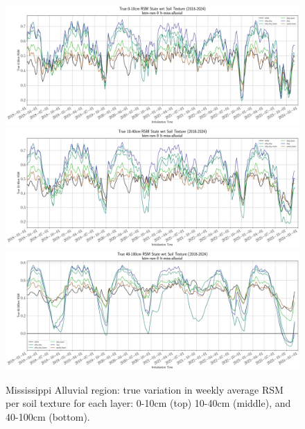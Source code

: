 \begin{figure}[hp!]
    \centering

    \includegraphics[width=.99\linewidth,draft=false]{figures/lt-miss-alluvial/eval-grid_lt-miss-alluvial_lstm-rsm-9_pixelwise-time-stats_txtr-true-state-rsm-10.png}
    \includegraphics[width=.99\linewidth,draft=false]{figures/lt-miss-alluvial/eval-grid_lt-miss-alluvial_lstm-rsm-9_pixelwise-time-stats_txtr-true-state-rsm-40.png}
    \includegraphics[width=.99\linewidth,draft=false]{figures/lt-miss-alluvial/eval-grid_lt-miss-alluvial_lstm-rsm-9_pixelwise-time-stats_txtr-true-state-rsm-100.png}

    \caption{Mississippi Alluvial region: true variation in weekly average RSM per soil texture for each layer: 0-10cm (top) 10-40cm (middle), and 40-100cm (bottom).}
    \label{lt_true-rsm_miss-alluvial}
\end{figure}

